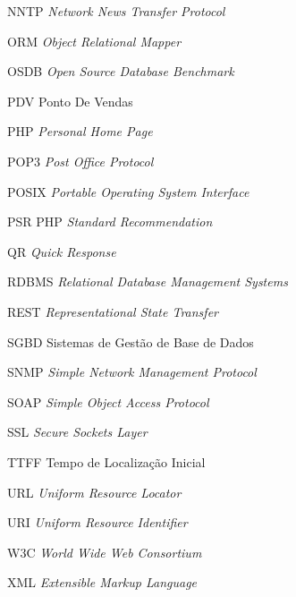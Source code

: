 \begin{siglas}
    \item[NNTP] \textit{Network News Transfer Protocol}
    \item[ORM] \textit{Object Relational Mapper}
    \item[OSDB] \textit{Open Source Database Benchmark}
    \item[PDV] Ponto De Vendas
    \item[PHP] \textit{Personal Home Page}
    \item[POP3] \textit{Post Office Protocol}
    \item[POSIX] \textit{Portable Operating System Interface}
    \item[PSR] PHP \textit{Standard Recommendation}
    \item[QR] \textit{Quick Response}
    \item[RDBMS] \textit{Relational Database Management Systems}
    \item[REST] \textit{Representational State Transfer}
    \item[SGBD] Sistemas de Gestão de Base de Dados
    \item[SNMP] \textit{Simple Network Management Protocol}
    \item[SOAP] \textit{Simple Object Access Protocol}
    \item[SSL] \textit{Secure Sockets Layer}
    \item[TTFF] Tempo de Localização Inicial
    \item[URL] \textit{Uniform Resource Locator}
    \item[URI] \textit{Uniform Resource Identifier}
    \item[W3C] \textit{World Wide Web Consortium}
    \item[XML] \textit{Extensible Markup Language}
\end{siglas}

